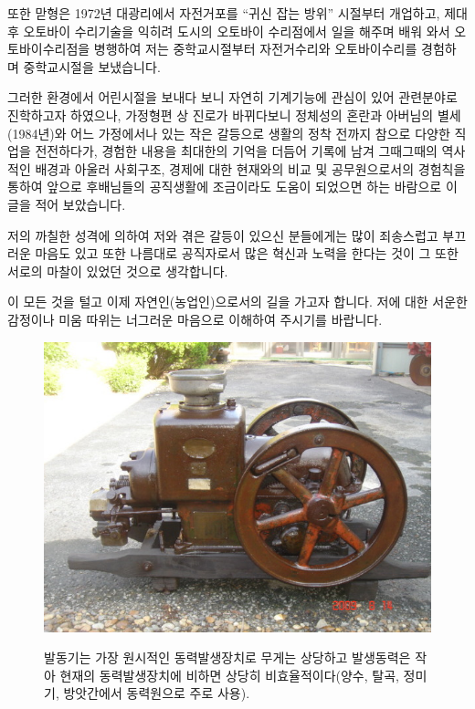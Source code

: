 \documentclass[chapter,book,openany,twoside]{oblivoir}
\begin{document}
또한 맏형은 1972년 대광리에서 자전거포를 ``귀신 잡는 방위'' 시절부터 개업하고, 제대 후 오토바이 수리기술을 익히려 도시의 오토바이 수리점에서 일을 해주며 배워 와서 오토바이수리점을 병행하여 저는 중학교시절부터 자전거수리와 오토바이수리를 경험하며 중학교시절을 보냈습니다.

그러한 환경에서 어린시절을 보내다 보니 자연히 기계기능에 관심이 있어 관련분야로 진학하고자 하였으나, 가정형편 상 진로가 바뀌다보니 정체성의 혼란과 아버님의 별세(1984년)와 어느 가정에서나 있는 작은 갈등으로 생활의 정착 전까지 참으로 다양한 직업을 전전하다가, 경험한 내용을 최대한의 기억을 더듬어 기록에 남겨 그때그때의 역사적인 배경과 아울러 사회구조, 경제에 대한 현재와의 비교 및 공무원으로서의 경험칙을 통하여 앞으로 후배님들의 공직생활에 조금이라도 도움이 되었으면 하는 바람으로 이 글을 적어 보았습니다.

저의 까칠한 성격에 의하여 저와 겪은 갈등이 있으신 분들에게는 많이 죄송스럽고 부끄러운 마음도 있고 또한 나름대로 공직자로서 많은 혁신과 노력을 한다는 것이 그 또한 서로의 마찰이 있었던 것으로 생각합니다.

이 모든 것을 털고 이제 자연인(농업인)으로서의 길을 가고자 합니다. 저에 대한 서운한 감정이나 미움 따위는 너그러운 마음으로 이해하여 주시기를 바랍니다.
\begin{figure}[b]
\centering \includegraphics[scale=0.5]{DBs/pic/002.jpg}\\
\caption{발동기는 가장 원시적인 동력발생장치로 무게는 상당하고 발생동력은 작아 현재의 동력발생장치에 비하면 상당히 비효율적이다(양수, 탈곡, 정미기, 방앗간에서 동력원으로 주로 사용).}
\end{figure}
\end{document}

